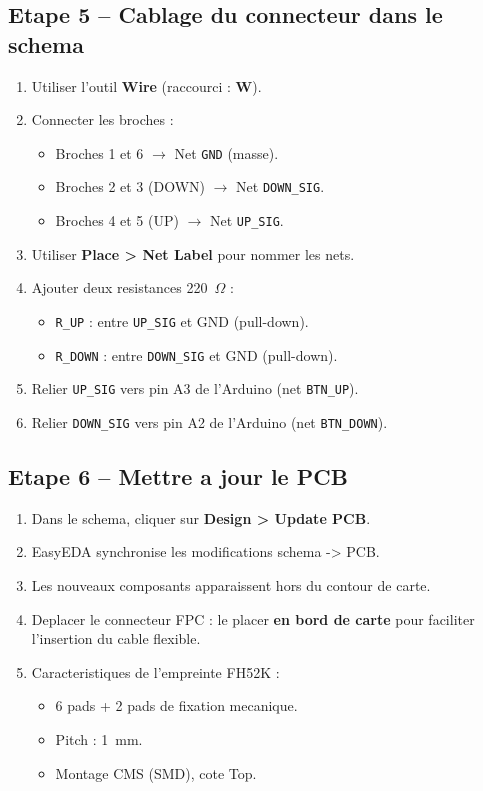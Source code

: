 \documentclass[12pt,a4paper]{article}
\begin{document}
\subsection{Etape 5 -- Cablage du connecteur dans le schema}

\begin{enumerate}
  \item Utiliser l'outil \textbf{Wire} (raccourci : \textbf{W}).
  \item Connecter les broches :
    \begin{itemize}
      \item Broches 1 et 6 $\rightarrow$ Net \texttt{GND} (masse).
      \item Broches 2 et 3 (DOWN) $\rightarrow$ Net \texttt{DOWN\_SIG}.
      \item Broches 4 et 5 (UP) $\rightarrow$ Net \texttt{UP\_SIG}.
    \end{itemize}
  \item Utiliser \textbf{Place > Net Label} pour nommer les nets.
  \item Ajouter deux resistances 220~$\Omega$ :
    \begin{itemize}
      \item \texttt{R\_UP} : entre \texttt{UP\_SIG} et GND (pull-down).
      \item \texttt{R\_DOWN} : entre \texttt{DOWN\_SIG} et GND (pull-down).
    \end{itemize}
  \item Relier \texttt{UP\_SIG} vers pin A3 de l'Arduino (net \texttt{BTN\_UP}).
  \item Relier \texttt{DOWN\_SIG} vers pin A2 de l'Arduino (net \texttt{BTN\_DOWN}).
\end{enumerate}

\subsection{Etape 6 -- Mettre a jour le PCB}

\begin{enumerate}
  \item Dans le schema, cliquer sur \textbf{Design > Update PCB}.
  \item EasyEDA synchronise les modifications schema -> PCB.
  \item Les nouveaux composants apparaissent hors du contour de carte.
  \item Deplacer le connecteur FPC : le placer \textbf{en bord de carte} pour
        faciliter l'insertion du cable flexible.
  \item Caracteristiques de l'empreinte FH52K :
    \begin{itemize}
      \item 6 pads + 2 pads de fixation mecanique.
      \item Pitch : 1~mm.
      \item Montage CMS (SMD), cote Top.
    \end{itemize}
\end{enumerate}
\end{document}
